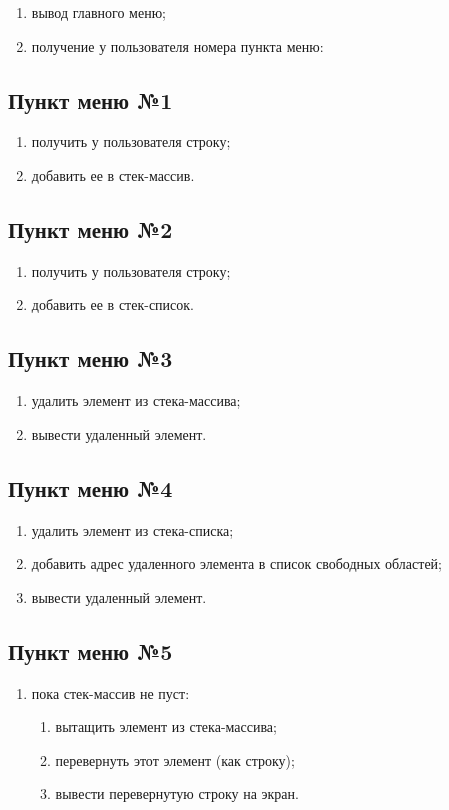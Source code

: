 \documentclass[a4paper,12pt]{extarticle}
\begin{document}
\begin{enumerate}
    \item вывод главного меню;
    \item получение у пользователя номера пункта меню:
\end{enumerate}

\subsection{Пункт меню №1}
\begin{enumerate}
    \item получить у пользователя строку;
    \item добавить ее в стек-массив.
\end{enumerate}

\subsection{Пункт меню №2}
\begin{enumerate}
    \item получить у пользователя строку;
    \item добавить ее в стек-список.
\end{enumerate}

\subsection{Пункт меню №3}
\begin{enumerate}
    \item удалить элемент из стека-массива;
    \item вывести удаленный элемент.
\end{enumerate}

\subsection{Пункт меню №4}
\begin{enumerate}
    \item удалить элемент из стека-списка;
    \item добавить адрес удаленного элемента в список свободных областей;
    \item вывести удаленный элемент.
\end{enumerate}

\subsection{Пункт меню №5}
\begin{enumerate}
    \item пока стек-массив не пуст:
    \begin{enumerate}
    	\item вытащить элемент из стека-массива;
    	\item перевернуть этот элемент (как строку);
    	\item вывести перевернутую строку на экран.
    \end{enumerate}
\end{enumerate}
\end{document}

